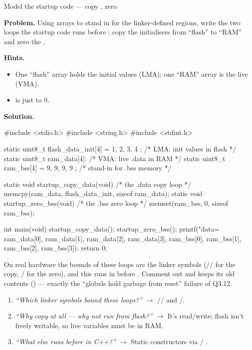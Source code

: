 \begin{gymproblem}{Model the startup code --- copy , zero
}

\textbf{Problem.} Using arrays to stand in for the linker-defined regions,
write the two loops the startup code runs before : copy the
 initialisers from ``flash'' to ``RAM'' and zero the .

\textbf{Hints.}
\begin{itemize}
\item One ``flash'' array holds the initial values (LMA); one ``RAM'' array is
  the live  (VMA).
\item {} is just  to 0.
\end{itemize}

\attempt

\textbf{Solution.}
\begin{cgym}
#include <stdio.h>
#include <string.h>
#include <stdint.h>

static uint8_t flash_data_init[4] = { 1, 2, 3, 4 };  /* LMA: init values in flash */
static uint8_t ram_data[4];                           /* VMA: live .data in RAM    */
static uint8_t ram_bss[4]  = { 9, 9, 9, 9 };          /* stand-in for .bss memory  */

static void startup_copy_data(void) {                 /* the .data copy loop */
    memcpy(ram_data, flash_data_init, sizeof ram_data);
}
static void startup_zero_bss(void) {                  /* the .bss zero loop  */
    memset(ram_bss, 0, sizeof ram_bss);
}

int main(void) {
    startup_copy_data();
    startup_zero_bss();
    printf("data=%
           ram_data[0], ram_data[1], ram_data[2], ram_data[3],
           ram_bss[0], ram_bss[1], ram_bss[2], ram_bss[3]);
    return 0;
}
\end{cgym}

On real hardware the bounds of these loops are the linker symbols
(// for the copy,
/ for the zero), and this runs in
 before . Comment out
 and  keeps its old contents
() --- exactly the ``globals hold garbage from reset'' failure of
Q3.12.

\followups
\begin{enumerate}
\item \emph{``Which linker symbols bound these loops?''} $\rightarrow$
  // and /.
\item \emph{``Why copy  at all --- why not run from flash?''}
  $\rightarrow$ It's read/write; flash isn't freely writable, so live
  variables must be in RAM.
\item \emph{``What else runs before  in C++?''} $\rightarrow$
  Static constructors via  / .
\end{enumerate}
\end{gymproblem}

